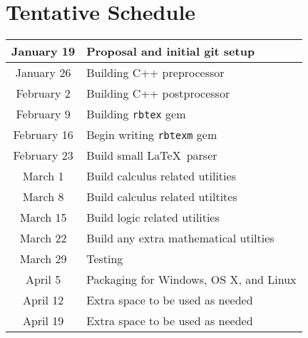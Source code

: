 \documentclass{article}
\newcommand{\inlinecode}[1]{\texttt{#1}}
\begin{document}
\section{Tentative Schedule}
\begin{center}
\begin{tabular}{| c | l |}
\hline
January 19 & Proposal and initial git setup\\
\hline
January 26 & Building C++ preprocessor\\
\hline
February 2 & Building C++ postprocessor\\
\hline
February 9 & Building \inlinecode{rbtex} gem\\
\hline
February 16 & Begin writing \inlinecode{rbtexm} gem\\
\hline
February 23 & Build small \LaTeX\ parser\\
\hline
March 1 & Build calculus related utilities\\
\hline
March 8 & Build calculus related utiltites\\
\hline
March 15 & Build logic related utilities\\
\hline
March 22 & Build any extra mathematical utilties\\
\hline
March 29 & Testing\\
\hline
April 5 & Packaging for Windows, OS X, and Linux\\
\hline
April 12 & Extra space to be used as needed\\
\hline
April 19 & Extra space to be used as needed\\
\hline
\end{tabular}
\end{center}
\end{document}

